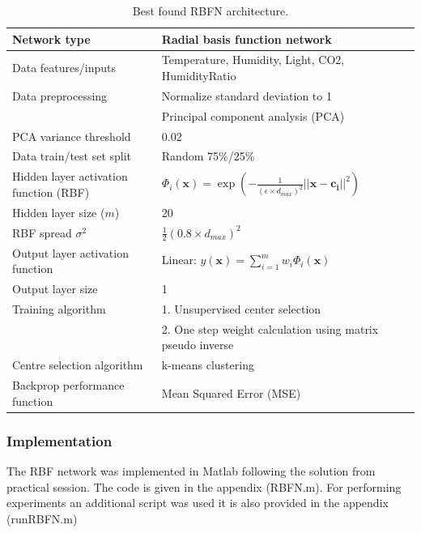 \documentclass[a4paper, 11pt]{article}
\begin{document}
\begin{table}[h!]
\centering
\begin{tabular}{|l l|} 
 \hline
 Network type & Radial basis function network  \\ 
 \hline
 Data features/inputs & Temperature, Humidity, Light, CO2, HumidityRatio\\
 Data preprocessing & Normalize standard deviation to 1 \\
 & Principal component analysis (PCA) \\
 PCA variance threshold & 0.02 \\ 
 Data train/test set split & Random 75\%/25\% \\
 \hline
 Hidden layer activation function (RBF) & $
\Phi_i(\boldsymbol{x}) = \exp\left(-\frac{1}{(\epsilon \times d_{max})^2} \lvert\lvert \boldsymbol{x} -  \boldsymbol{c_i} \rvert\rvert ^2\right)  
$  \\
 Hidden layer size ($m$) & 20  \\
 RBF spread $\sigma^2$ & $\frac{1}{2}(0.8 \times d_{max})^2$   \\
 \hline
 Output layer activation function & Linear: $y(\boldsymbol{x}) = \displaystyle\sum_{i=1}^{m} w_i \Phi_i(\boldsymbol{x})$ \\
 Output layer size & 1 \\
 \hline
 Training algorithm & 1. Unsupervised center selection \\ 
 & 2. One step weight calculation using matrix pseudo inverse  \\
 Centre selection algorithm & k-means clustering \\
 Backprop performance function & Mean Squared Error (MSE)  \\ [1ex] 
 \hline
\end{tabular}
\caption{Best found RBFN architecture.}
\label{table:architecture}
\end{table}

\subsubsection*{Implementation}
The RBF network was implemented in Matlab following the solution from practical session. The code is given in the appendix (RBFN.m). For performing experiments an additional script was used it is also provided in the appendix (runRBFN.m)
\end{document}
